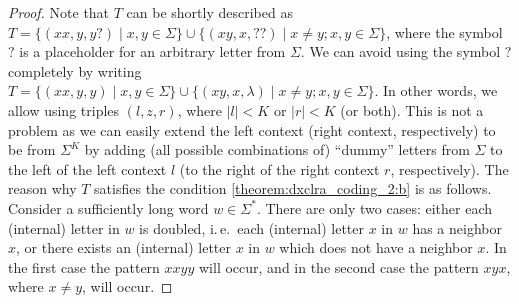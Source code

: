 \begin{proof}
Note that $T$ can be shortly described as $T = \{ (xx, y, y?) \mid x, y \in \Sigma \} \cup \{ (xy, x, ??) \mid x \neq y; x, y \in \Sigma \}$,  where the symbol $?$ is a placeholder for an arbitrary letter from $\Sigma$. We can avoid using the symbol $?$ completely by writing $T = \{ (xx, y, y) \mid x, y \in \Sigma \} \cup \{ (xy, x, \lambda) \mid x \neq y; x, y \in \Sigma \}$. In other words, we allow using triples $(l, z, r)$, where $|l| < K$ or $|r| < K$ (or both). This is not a problem as we can easily extend the left context (right context, respectively) to be from $\Sigma^K$ by adding (all possible combinations of) ``dummy'' letters from $\Sigma$ to the left of the left context $l$ (to the right of the right context $r$, respectively). The reason why $T$ satisfies the condition \ref{theorem:dxclra_coding_2:b} is as follows. Consider a sufficiently long word $w \in \Sigma^*$. There are only two cases: either each (internal) letter in $w$ is doubled, i.\,e.\ each (internal) letter $x$ in $w$ has a neighbor $x$, or there exists an (internal) letter $x$ in $w$ which does not have a neighbor $x$. In the first case the pattern $xxyy$ will occur, and in the second case the pattern $xyx$, where $x \neq y$, will occur.


\end{proof}
